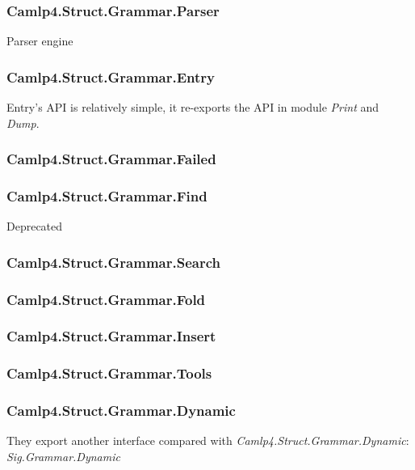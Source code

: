 \subsubsection{Camlp4.Struct.Grammar.Parser}
\label{Camlp4.Struct.Grammar.Parser}
Parser engine 

\subsubsection{Camlp4.Struct.Grammar.Entry}
\label{Camlp4.Struct.Grammar.Entry}
Entry's API is relatively simple, it re-exports the API in
module \textit{Print} and \textit{Dump}.


\subsubsection{Camlp4.Struct.Grammar.Failed}
\label{Camlp4.Struct.Grammar.Failed}

\subsubsection{Camlp4.Struct.Grammar.Find}
\label{Camlp4.Struct.Grammar.Find}
Deprecated

\subsubsection{Camlp4.Struct.Grammar.Search}
\label{Camlp4.Struct.Grammar.Search}


\subsubsection{Camlp4.Struct.Grammar.Fold}
\label{Camlp4.Struct.Grammar.Fold}

\subsubsection{Camlp4.Struct.Grammar.Insert}
\label{Camlp4.Struct.Grammar.Insert}

\subsubsection{Camlp4.Struct.Grammar.Tools}
\label{Camlp4.Struct.Grammar.Tools}


\subsubsection{Camlp4.Struct.Grammar.Dynamic}
\label{Camlp4.Struct.Grammar.Dynamic}
They export another interface compared with
\textit{Camlp4.Struct.Grammar.Dynamic}: \textit{Sig.Grammar.Dynamic}

